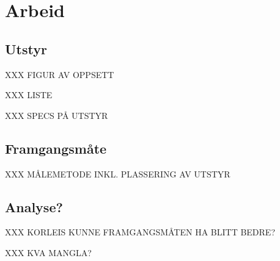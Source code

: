 \section{Arbeid}
\subsection{Utstyr}
XXX FIGUR AV OPPSETT

XXX LISTE

XXX SPECS PÅ UTSTYR
\subsection{Framgangsmåte}
XXX MÅLEMETODE INKL. PLASSERING AV UTSTYR

\subsection{Analyse?}
XXX KORLEIS KUNNE FRAMGANGSMÅTEN HA BLITT BEDRE?

XXX KVA MANGLA?
